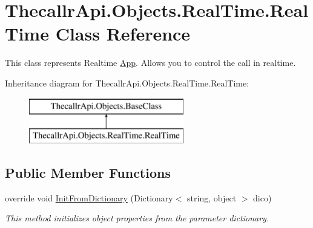 \hypertarget{class_thecallr_api_1_1_objects_1_1_real_time_1_1_real_time}{\section{Thecallr\+Api.\+Objects.\+Real\+Time.\+Real\+Time Class Reference}
\label{class_thecallr_api_1_1_objects_1_1_real_time_1_1_real_time}
}


This class represents Realtime \hyperlink{namespace_thecallr_api_1_1_objects_1_1_app}{App}. Allows you to control the call in realtime.  


Inheritance diagram for Thecallr\+Api.\+Objects.\+Real\+Time.\+Real\+Time\+:\begin{figure}[H]
\begin{center}
\leavevmode
\includegraphics[height=2.000000cm]{class_thecallr_api_1_1_objects_1_1_real_time_1_1_real_time}
\end{center}
\end{figure}
\subsection*{Public Member Functions}
\begin{DoxyCompactItemize}
\item 
override void \hyperlink{class_thecallr_api_1_1_objects_1_1_real_time_1_1_real_time_a99e33578b5501668eeb600aa93026d2e}{Init\+From\+Dictionary} (Dictionary$<$ string, object $>$ dico)
\begin{DoxyCompactList}\small\item\em This method initializes object properties from the parameter dictionary. \end{DoxyCompactList}\end{DoxyCompactItemize}
